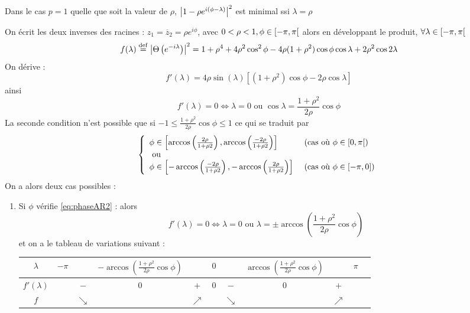 \documentclass{report}
\begin{document}
\begin{Ex}[Cas où p=1 :]
Dans le cas $p=1$ quelle que soit la valeur de $\rho$, ${ \left| 1-\rho e^{i(\phi-\lambda)} \right|}^2$ est minimal ssi $\lambda = \rho$
\end{Ex}
\begin{Ex}[Cas où p=2 à racines complexes conjuguées]
On écrit les deux inverses des racines : $z_1=\overline{z}_2 = \rho e^{i\phi}$, avec $0<\rho<1, \phi \in {\left[ -\pi,\pi \right[}$ alors en développant le produit, $\forall \lambda \in {\left[ -\pi,\pi \right[}$
$$
f(\lambda) \stackrel{\rm def}{=} { \left| \Theta\left( e^{-i\lambda}\right) \right|}^2 = 1 + \rho^4 + 4\rho^2 \cos^2{\phi} - 4\rho(1+\rho^2)\cos{\phi} \cos{\lambda} + 2\rho^2\cos{2\lambda}
$$
On dérive :
$$
f'(\lambda) = 4\rho \sin(\lambda) \left[ (1+\rho^2) \cos{\phi} - 2\rho \cos{\lambda} \right]
$$
ainsi 
$$
f'(\lambda)=0 \iff \lambda = 0 \mbox{ ou } \cos{\lambda} = \frac{1+\rho^2}{2\rho} \cos{\phi}
$$
La seconde condition n'est possible que si $ -1\leq \frac{1+\rho^2}{2\rho} \cos{\phi} \leq 1$ ce qui se traduit par 
\begin{equation}\label{eq:phaseAR2}
{ \left\lbrace \begin{array}{ll} 
\phi \in {\left[ \arccos\left( \frac{2\rho}{1+\rho2} \right), \arccos\left( \frac{-2\rho}{1+\rho2} \right) \right]} & \mbox{ (cas où $\phi \in {\left[ 0,\pi \right[}$)} \\
\mbox{ ou } & \\
\phi \in {\left[ -\arccos\left( \frac{-2\rho}{1+\rho2} \right), -\arccos\left( \frac{2\rho}{1+\rho2} \right) \right]} & \mbox{ (cas où $\phi \in {\left[ -\pi,0 \right]}$)} \\
 \end{array} \right. }
\end{equation}
On a alors deux cas possibles :
\begin{enumerate}
\item Si $\phi$ vérifie \eqref{eq:phaseAR2} : alors 
$$
f'(\lambda)=0 \iff \lambda = 0 \mbox{ ou } \lambda = \pm \arccos\left(\frac{1+\rho^2}{2\rho} \cos{\phi}\right)
$$
et on a le tableau de variations suivant : \\
\begin{center}
\begin{tabular}{c|cccccccccc}
$\lambda$ & $-\pi$ & & $-\arccos\left(\frac{1+\rho^2}{2\rho} \cos{\phi}\right)$ & & $0$ & & $\arccos\left(\frac{1+\rho^2}{2\rho} \cos{\phi}\right)$ & & $\pi$  \\
\hline
$f'(\lambda)$ & & $-$ & $0$ & $+$ & $0$ & $-$ & $0$ & $+$ & \\
\hline
$f$ & & $\searrow$ & & $\nearrow$ & & $\searrow$ & & $\nearrow$ \\
\end{tabular}

\end{center}
\end{enumerate}
\end{Ex}
\end{document}
